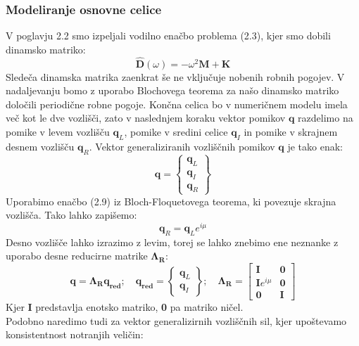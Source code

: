 \documentclass[12pt]{report}
\begin{document}
\subsubsection{Modeliranje osnovne celice}
V poglavju 2.2 smo izpeljali vodilno enačbo problema (2.3), kjer smo dobili dinamsko matriko:
\begin{equation}
  \mathbf{\hat{D}}(\omega)= -{\omega}^2 \mathbf{M}+\mathbf{K}
\end{equation}
Sledeča dinamska matrika zaenkrat še ne vključuje nobenih robnih pogojev. V nadaljevanju bomo z uporabo Blochovega teorema za našo
dinamsko matriko določili periodične robne pogoje. Končna celica bo v numeričnem modelu imela več kot le dve vozlišči, zato v naslednjem koraku vektor pomikov $\mathbf{q}$
razdelimo na pomike v levem vozlišču $\mathbf{q}_L$, pomike v sredini celice $\mathbf{q}_I$ in pomike v skrajnem desnem vozlišču $\mathbf{q}_R$. Vektor generaliziranih vozliščnih pomikov $\mathbf{q}$
je tako enak:
\begin{equation}
  \mathbf{q}=
    \begin{Bmatrix}
      \mathbf{q}_L \\
      \mathbf{q}_I \\
      \mathbf{q}_R
    \end{Bmatrix}
\end{equation}
Uporabimo enačbo (2.9) iz Bloch-Floquetovega teorema, ki povezuje skrajna vozlišča. Tako lahko zapišemo:
\begin{equation}
  \mathbf{q}_R = \mathbf{q}_L e^{i\mu}
\end{equation}
Desno vozlišče lahko izrazimo z levim, torej se lahko znebimo ene neznanke z uporabo desne reducirne matrike $\mathbf{\Lambda_R}$:
\begin{equation}
  \mathbf{q}=\mathbf{\Lambda_R q_{red}}; \quad 
  \mathbf{q_{red}} = \begin{Bmatrix}
    \mathbf{q}_L \\
    \mathbf{q}_I
  \end{Bmatrix}; \quad
  \mathbf{\Lambda_R} = \begin{bmatrix}
    \mathbf{I} & \mathbf{0} \\
    \mathbf{I}e^{i\mu} & \mathbf{0} \\
    \mathbf{0} & \mathbf{I}
  \end{bmatrix}
\end{equation}
Kjer \textbf{I} predstavlja enotsko matriko, \textbf{0} pa matriko ničel.\\
Podobno naredimo tudi za vektor generalizirnih vozliščnih sil, kjer upoštevamo konsistentnost notranjih veličin:
\end{document}
